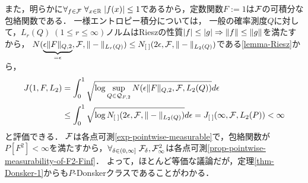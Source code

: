 \documentclass[uplatex,dvipdfmx]{jsreport}
\begin{document}
\begin{example}[区間の定義関数クラス]
\begin{description}
    また，明らかに$\forall_{f\in\mathcal{F}}\;\forall_{x\in\mathbb{R}}\;\lvert f(x)\rvert\le 1$であるから，定数関数$F:=1$は$\mathcal{F}$の可積分な包絡関数である．
    一様エントロピー積分については，
    一般の確率測度$Q$に対して，$L_r(Q)\;(1\le r\le\infty)$ノルムはRieszの性質$\lvert f\rvert\le\lvert g\rvert\Rightarrow\|f\|\le\|g\|$を満たすから，
    $N(\underbrace{\epsilon\|F\|_{Q,2}}_{=\epsilon},\mathcal{F},\|-\|_{L_r(Q)})\le N_{[\;]}(2\epsilon,\mathcal{F},\|-\|_{L_2(Q)})$である\ref{lemma-Riesz}から，
    \begin{align*}
        J(1,F,L_2)&=\int^1_0\sqrt{\log\sup_{Q\in\mathcal{Q}_{F,2}}N(\epsilon\|F\|_{Q,2},\mathcal{F},L_2(Q))}d\epsilon\\
        &\le\int^1_0\sqrt{\log N_{[\;]}(2\epsilon,\mathcal{F},\|-\|_{L_2(Q)})}d\epsilon=J_{[\;]}(\infty,\mathcal{F},L_2(P))<\infty
    \end{align*}
    と評価できる．
    $\mathcal{F}$は各点可測\ref{exp-pointwise-measurable}で，包絡関数が$P[F^2]<\infty$を満たすから，$\forall_{\delta\in(0,\infty]}\;\mathcal{F}_\delta,\mathcal{F}^2_\infty$は各点可測\ref{prop-pointwise-measurability-of-F2-Finf}．
    よって，ほとんど等価な議論だが，定理\ref{thm-Donsker-1}からも$P$-Donskerクラスであることがわかる．
    \end{description}
\end{example}
\end{document}
